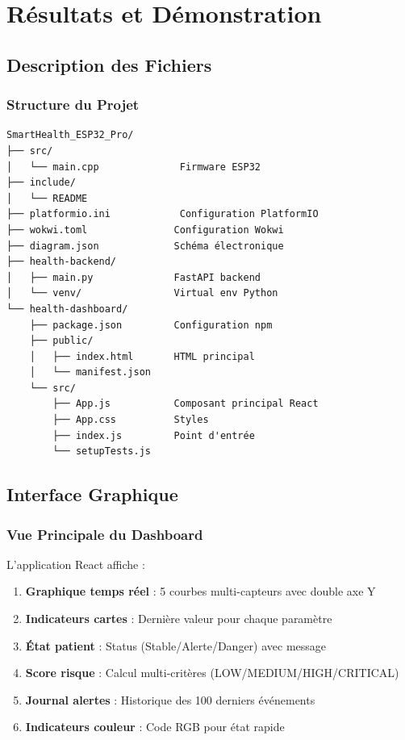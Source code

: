 \documentclass[12pt,french]{report}
\begin{document}
\chapter{Résultats et Démonstration}

\section{Description des Fichiers}

\subsection{Structure du Projet}

\begin{verbatim}
SmartHealth_ESP32_Pro/
├── src/
│   └── main.cpp              Firmware ESP32
├── include/
│   └── README
├── platformio.ini            Configuration PlatformIO
├── wokwi.toml               Configuration Wokwi
├── diagram.json             Schéma électronique
├── health-backend/
│   ├── main.py              FastAPI backend
│   └── venv/                Virtual env Python
└── health-dashboard/
    ├── package.json         Configuration npm
    ├── public/
    │   ├── index.html       HTML principal
    │   └── manifest.json
    └── src/
        ├── App.js           Composant principal React
        ├── App.css          Styles
        ├── index.js         Point d'entrée
        └── setupTests.js
\end{verbatim}

\section{Interface Graphique}

\subsection{Vue Principale du Dashboard}

L'application React affiche :

\begin{enumerate}
    \item \textbf{Graphique temps réel} : 5 courbes multi-capteurs avec double axe Y
    \item \textbf{Indicateurs cartes} : Dernière valeur pour chaque paramètre
    \item \textbf{État patient} : Status (Stable/Alerte/Danger) avec message
    \item \textbf{Score risque} : Calcul multi-critères (LOW/MEDIUM/HIGH/CRITICAL)
    \item \textbf{Journal alertes} : Historique des 100 derniers événements
    \item \textbf{Indicateurs couleur} : Code RGB pour état rapide
\end{enumerate}
\end{document}
